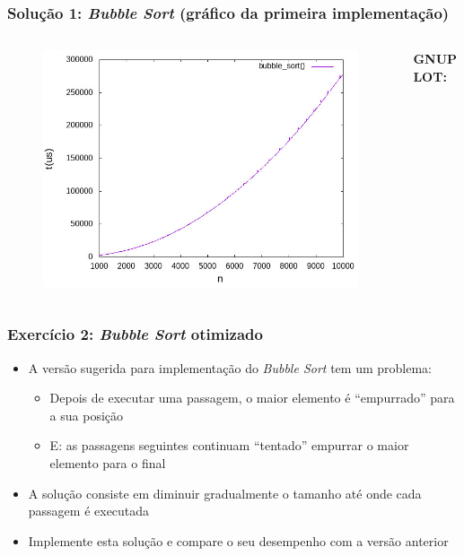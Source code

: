 \documentclass[aspectratio=169]{beamer}
\begin{document}
\begin{frame}[fragile]\frametitle{Solução 1: \emph{Bubble Sort} (gráfico da primeira implementação)}
\vspace{-5mm}
\begin{columns}[T]
\begin{column}{0.6\linewidth}
\begin{figure}[h]
	\centering
	\includegraphics[height=0.75\paperheight]{bubble_sort/grafico1.jpg}
\end{figure}
\end{column}
\begin{column}{0.4\linewidth}
\vspace{5mm}
{\fontsize{0}{4}\selectfont{}\textbf{GNUPLOT:}

}
\end{column}
\end{columns}
\end{frame}

\begin{frame}[fragile]\frametitle{Exercício 2: \emph{Bubble Sort} otimizado}
\begin{itemize}
	\item A versão sugerida para implementação do \emph{Bubble Sort} tem um problema:
	\begin{itemize}
		\item Depois de executar uma passagem, o maior elemento é ``empurrado'' para a sua posição
		\item E: as passagens seguintes continuam ``tentado'' empurrar o maior elemento para o final
	\end{itemize}
	\item A solução consiste em diminuir gradualmente o tamanho até onde cada passagem é executada
	\item Implemente esta solução e compare o seu desempenho com a versão anterior
\end{itemize}
\end{frame}
\end{document}
